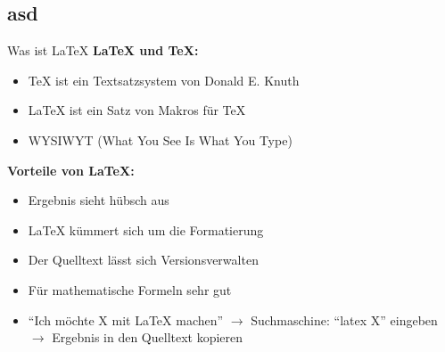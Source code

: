 \documentclass{beamer}
\begin{document}
		\subsection*{asd}
		\begin{frame}{Was ist \LaTeX{}}
			\textbf{\LaTeX{} und \TeX{}:}
			\begin{itemize}
				\item \TeX{} ist ein Textsatzsystem von Donald E. Knuth
				\item \LaTeX{} ist ein Satz von Makros für \TeX
				\item WYSIWYT (What You See Is What You Type)
			\end{itemize}
			\vspace{0.2cm}
			\textbf{Vorteile von \LaTeX{}:}
			\begin{itemize}
				\item Ergebnis sieht hübsch aus
				\item \LaTeX{} kümmert sich um die Formatierung
				\item Der Quelltext lässt sich Versionsverwalten
				\item Für mathematische Formeln sehr gut
				\item ``Ich möchte X mit \LaTeX{} machen'' $\rightarrow$
				Suchmaschine: ``latex X'' eingeben $\rightarrow$
				Ergebnis in den Quelltext kopieren
			\end{itemize}
		\end{frame}
\end{document}
